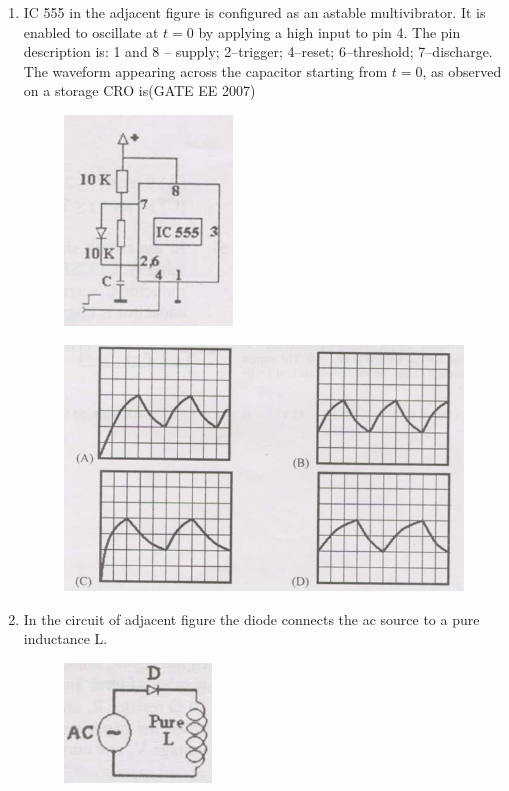 \documentclass[a4paper,10pt]{exam}
\theoremstyle{remark}
\begin{document}
\begin{enumerate}
\begin{multicols}{2}
\begin{enumerate}
\item  -$25$V,$0.0$ 
\item  very large voltage, very large current
\item   $5.0$V, $0.5$
\item  -$5.0$V ,-$0.5$ A
\end{enumerate}
\end{multicols}
\vspace{0.5cm}
\item  \quad IC 555 in the adjacent figure is configured as an astable multivibrator. It is enabled to oscillate at $t=0$ by applying a high input to pin 4. The pin description is: 1 and 8 -- supply; 2--trigger; 4--reset; 6--threshold; 7--discharge. The waveform appearing across the capacitor starting from $t=0$, as observed on a storage CRO is\hfill{(GATE EE 2007)} 
\begin{figure}[H]
    \centering
    \includegraphics[width=0.2\linewidth]{figs/Q 58(Q).png} \caption{}     \label{fig:myfigure}
\end{figure}

\begin{figure}[H]
    \centering
    \includegraphics[width=0.5\linewidth]{figs/Q 58 opt.png} 
\end{figure}
\vfill
{}
\newpage

\item  \quad In the circuit of adjacent figure the diode connects the ac
source to a pure inductance L.
\begin{figure}[H]
    \centering
    \includegraphics[width=0.2\linewidth]{figs/Q 59.png} \caption{}     \label{fig:myfigure}
\end{figure}



\end{enumerate}
\end{document}
